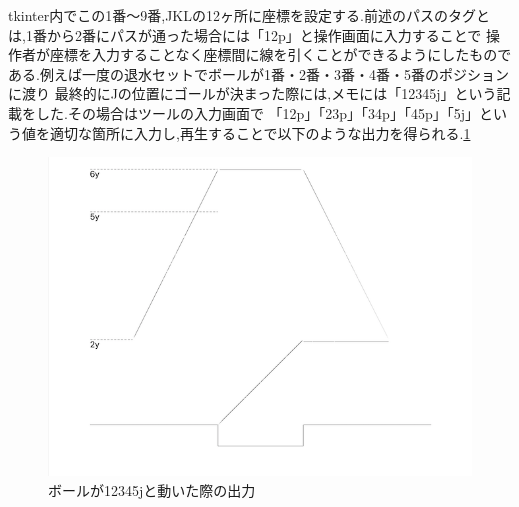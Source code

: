 \documentclass[../main.tex]{subfiles}
\begin{document}
tkinter内でこの1番〜9番,JKLの12ヶ所に座標を設定する.前述のパスのタグとは,1番から2番にパスが通った場合には「12p」と操作画面に入力することで
操作者が座標を入力することなく座標間に線を引くことができるようにしたものである.例えば一度の退水セットでボールが1番・2番・3番・4番・5番のポジションに渡り
最終的にJの位置にゴールが決まった際には,メモには「12345j」という記載をした.その場合はツールの入力画面で
「12p」「23p」「34p」「45p」「5j」という値を適切な箇所に入力し,再生することで以下のような出力を得られる.\ref{img:ballmovement12345j}

\begin{figure}[ht]
    \begin{center}
        \includegraphics{img/05.png}
        \caption{ボールが12345jと動いた際の出力}
    \label{img:ballmovement12345j}
    \end{center}
\end{figure}
\end{document}
